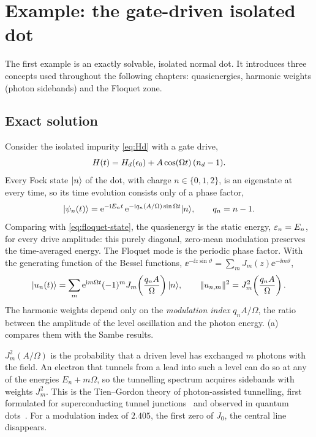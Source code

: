 \chapter{Example: the gate-driven isolated dot}\label{ch:ex-dot}

The first example is an exactly solvable, isolated normal dot. It
introduces three concepts used throughout the following chapters: quasienergies, harmonic weights
(photon sidebands) and the Floquet zone.

\section{Exact solution}

Consider the isolated impurity \eqref{eq:Hd} with a gate drive,
\begin{equation}
  H(t)=H_{d}(\epsilon_0)+A\cos(\Omega t)\,(n_d-1).
\end{equation}
Every Fock state $\lvert n\rangle$ of the dot, with charge $n\in\{0,1,2\}$, is an eigenstate at
every time, so its time evolution consists only of a phase factor,
\begin{equation}
  \lvert \psi_n(t)\rangle=\mathrm{e}^{-\mathrm{i} E_nt}\,\mathrm{e}^{-\mathrm{i} q_n(A/\Omega)\sin\Omega t}\lvert n\rangle,\qquad q_n=n-1 .
\end{equation}
Comparing with \cref{eq:floquet-state}, the quasienergy is the static energy, $\varepsilon_n=E_n$,
for every drive amplitude: this purely diagonal, zero-mean modulation preserves the
time-averaged energy. The Floquet mode is the periodic phase factor. With the generating
function of the Bessel functions,
$\ee^{-\ii z\sin\vartheta}=\sum_mJ_m(z)\ee^{-\ii m\vartheta}$,
\begin{equation}\label{eq:dot-weights}
  \lvert u_n(t)\rangle=\sum_m \mathrm{e}^{\mathrm{i} m\Omega t}(-1)^mJ_m\!\left(\frac{q_nA}\Omega\right)\lvert n\rangle,
  \qquad \lVert u_{n,m}\rVert^2=J_m^2\!\left(\frac{q_nA}{\Omega}\right).
\end{equation}
The harmonic weights depend only on the \emph{modulation index} $q_nA/\Omega$, the ratio
between the amplitude of the level oscillation and the photon energy. (a)
compares them with the Sambe results.

\begin{physics}
$J_m^2(A/\Omega)$ is the probability that a driven level has exchanged $m$ photons with
the field. An electron that tunnels from a lead into such a level can do so at any of the
energies $E_n+m\Omega$, so the tunnelling spectrum acquires sidebands with weights
$J_m^2$. This is the Tien--Gordon theory of photon-assisted tunnelling, first formulated for
superconducting tunnel junctions~\cite{tien1963multiphoton,dayem1962quantum} and observed in
quantum dots~\cite{kouwenhoven1994photon,kouwenhoven1994observation,oosterkamp1998microwave}.
For a modulation index of $2.405$, the first zero of $J_0$, the central line disappears.
\end{physics}

